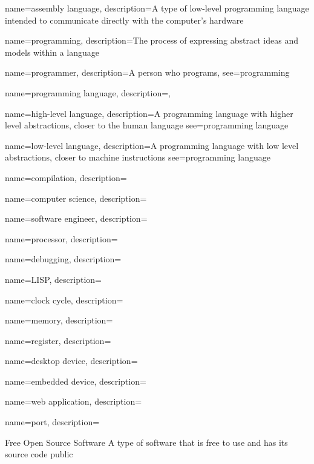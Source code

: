 \makeglossaries


 {
  name=assembly language,
  description={A type of low-level programming language intended to communicate directly with the computer's hardware}
}

 {
  name=programming,
  description={The process of expressing abstract ideas and models within a language}
}

 {
  name=programmer,
  description={A person who programs},
  see={programming}
}

 {
  name=programming language,
  description={},
}

 {
  name=high-level language,
  description={A programming language with higher level abstractions, closer to the human language}
  see={programming language}
}

 {
  name=low-level language,
  description={A programming language with low level abstractions, closer to machine instructions}
  see={programming language}
}

 {
  name=compilation,
  description={}
}

 {
  name=computer science,
  description={}
}

 {
  name=software engineer,
  description={}
}

 {
  name=processor,
  description={}
}

 {
  name=debugging,
  description={}
}

 {
  name=LISP,
  description={}
}

 {
  name=clock cycle,
  description={}
}

 {
  name=memory,
  description={}
}

 {
  name=register,
  description={}
}

 {
  name=desktop device,
  description={}
}

 {
  name=embedded device,
  description={}
}

 {
  name=web application,
  description={}
}

 {
  name=port,
  description={}
}



  {Free Open Source Software}
  {A type of software that is free to use and has its source code public}




